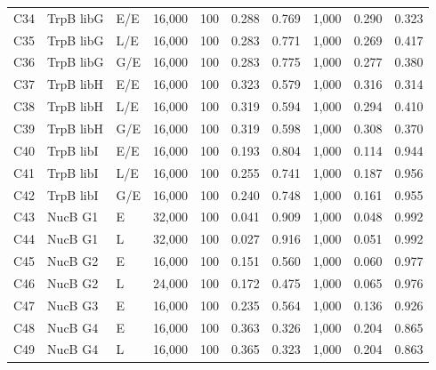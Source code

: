 \begin{longtable}[c]{lllrrrrrrr}
C34 & TrpB libG & E/E & 16,000 & 100 & 0.288 & 0.769 & 1,000 & 0.290 & 0.323 \\
C35 & TrpB libG & L/E & 16,000 & 100 & 0.283 & 0.771 & 1,000 & 0.269 & 0.417 \\
C36 & TrpB libG & G/E & 16,000 & 100 & 0.283 & 0.775 & 1,000 & 0.277 & 0.380 \\
C37 & TrpB libH & E/E & 16,000 & 100 & 0.323 & 0.579 & 1,000 & 0.316 & 0.314 \\
C38 & TrpB libH & L/E & 16,000 & 100 & 0.319 & 0.594 & 1,000 & 0.294 & 0.410 \\
C39 & TrpB libH & G/E & 16,000 & 100 & 0.319 & 0.598 & 1,000 & 0.308 & 0.370 \\
C40 & TrpB libI & E/E & 16,000 & 100 & 0.193 & 0.804 & 1,000 & 0.114 & 0.944 \\
C41 & TrpB libI & L/E & 16,000 & 100 & 0.255 & 0.741 & 1,000 & 0.187 & 0.956 \\
C42 & TrpB libI & G/E & 16,000 & 100 & 0.240 & 0.748 & 1,000 & 0.161 & 0.955 \\
C43 & NucB G1 & E & 32,000 & 100 & 0.041 & 0.909 & 1,000 & 0.048 & 0.992 \\
C44 & NucB G1 & L & 32,000 & 100 & 0.027 & 0.916 & 1,000 & 0.051 & 0.992 \\
C45 & NucB G2 & E & 16,000 & 100 & 0.151 & 0.560 & 1,000 & 0.060 & 0.977 \\
C46 & NucB G2 & L & 24,000 & 100 & 0.172 & 0.475 & 1,000 & 0.065 & 0.976 \\
C47 & NucB G3 & E & 16,000 & 100 & 0.235 & 0.564 & 1,000 & 0.136 & 0.926 \\
C48 & NucB G4 & E & 16,000 & 100 & 0.363 & 0.326 & 1,000 & 0.204 & 0.865 \\
C49 & NucB G4 & L & 16,000 & 100 & 0.365 & 0.323 & 1,000 & 0.204 & 0.863 \\
\end{longtable}
\endgroup
